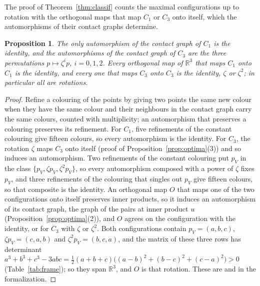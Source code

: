 \documentclass[12pt]{amsart}
\newtheorem{proposition}[theorem]{Proposition}
\theoremstyle{definition}
\theoremstyle{plain}
\theoremstyle{definition}
\newcommand{\R}{\mathbb{R}}
\newcommand{\CI}{C_1}
\newcommand{\CIII}{C_3}
\newcommand{\leanmap}[1]{\ignorespaces}
\newcommand{\mapnote}[1]{\ignorespaces}
\begin{document}
The proof of Theorem~\ref{thm:classif} counts the maximal configurations up to rotation with the orthogonal maps that map $\CI$ or $\CIII$ onto itself, which the automorphisms of their contact graphs determine.

\begin{proposition}\label{prop:auto}\leanmap{Tammes15.PaperSteps.aut_contactGraph_C1, Tammes15.PaperSteps.aut_contactGraph_C3, Tammes15.PaperSteps.orthogonal_C1, Tammes15.PaperSteps.orthogonal_C3, Tammes15.PaperSteps.orthogonal_det}\mapnote{with no hypothesis: the automorphisms of the contact graphs at $u$ on the labels of the points (first and second declarations), the linear isometries of $\mathbb{R}^3$ that map the set of points onto itself (third and fourth), and their determinant $1$ (fifth)}
The only automorphism of the contact graph of $\CI$ is the identity, and the automorphisms of the contact graph of $\CIII$ are the three permutations $p\mapsto\zeta^ip$, $i=0,1,2$. Every orthogonal map of $\R^3$ that maps $\CI$ onto $\CI$ is the identity, and every one that maps $\CIII$ onto $\CIII$ is the identity, $\zeta$ or $\zeta^2$; in particular all are rotations.
\end{proposition}

\begin{proof}
Refine a colouring of the points by giving two points the same new colour when they have the same colour and their neighbours in the contact graph carry the same colours, counted with multiplicity; an automorphism that preserves a colouring preserves its refinement. For $\CI$, five refinements of the constant colouring give fifteen colours, so every automorphism is the identity. For $\CIII$, the rotation $\zeta$ maps $\CIII$ onto itself (proof of Proposition~\ref{prop:optima}(3)) and so induces an automorphism. Two refinements of the constant colouring put $p_V$ in the class $\{p_V,\zeta p_V,\zeta^2p_V\}$, so every automorphism composed with a power of $\zeta$ fixes $p_V$, and three refinements of the colouring that singles out $p_V$ give fifteen colours, so that composite is the identity. An orthogonal map $O$ that maps one of the two configurations onto itself preserves inner products, so it induces an automorphism of its contact graph, the graph of the pairs at inner product $u$ (Proposition~\ref{prop:optima}(2)), and $O$ agrees on the configuration with the identity, or for $\CIII$ with $\zeta$ or $\zeta^2$. Both configurations contain $p_V=(a,b,c)$, $\zeta p_V=(c,a,b)$ and $\zeta^2p_V=(b,c,a)$, and the matrix of these three rows has determinant $a^3+b^3+c^3-3abc=\tfrac12(a+b+c)\big((a-b)^2+(b-c)^2+(c-a)^2\big)>0$ (Table~\ref{tab:frame}); so they span $\R^3$, and $O$ is that rotation. These are  and  in the formalization.
\end{proof}
\end{document}
